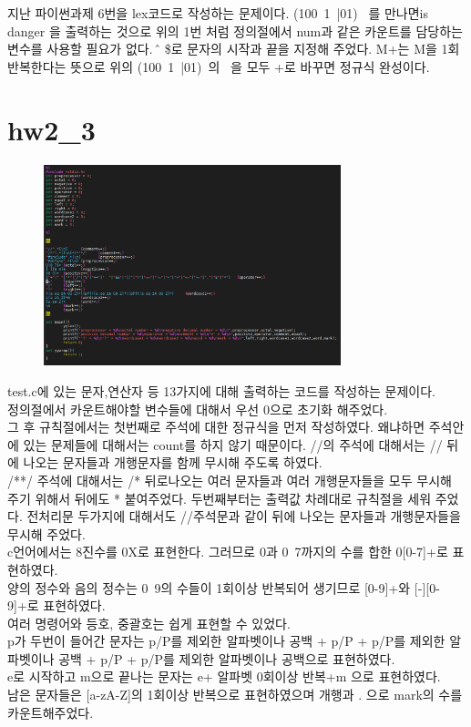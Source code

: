 \documentclass[conference]{IEEEtran}
\begin{document}
지난 파이썬과제 6번을 lex코드로 작성하는 문제이다. (100~1~|01)~ 를 만나면is danger 을 출력하는 것으로 위의 1번 처럼 정의절에서 num과 같은 카운트를 담당하는 변수를 사용할 필요가 없다. \^과 \$로 문자의 시작과 끝을 지정해 주었다. M+는 M을 1회반복한다는 뜻으로 위의 (100~1~|01)~의 ~을 모두 +로 바꾸면 정규식 완성이다.


\section{hw2_3}

\begin{figure}[ht!] %
\centering
\includegraphics[width=3.4in]{3.png}
\label{bench}
\end{figure}
	test.c에 있는 문자,연산자 등 13가지에 대해 출력하는 코드를 작성하는 문제이다. \\
	정의절에서 카운트해야할 변수들에 대해서 우선 0으로 초기화 해주었다. \\
	그 후 규칙절에서는 첫번째로 주석에 대한 정규식을 먼저 작성하였다. 왜냐하면 주석안에 있는 문제들에 대해서는 count를 하지 않기 때문이다. //의 주석에 대해서는 // 뒤에 나오는 문자들과 개행문자를 함께 무시해 주도록 하였다. \\ /**/ 주석에 대해서는 /* 뒤로나오는 여러 문자들과 여러 개행문자들을 모두 무시해 주기 위해서 뒤에도 * 붙여주었다. 두번째부터는 출력값 차례대로 규칙절을 세워 주었다. 전처리문 두가지에 대해서도 //주석문과 같이 뒤에 나오는 문자들과 개행문자들을 무시해 주었다. \\
    c언어에서는 8진수를 0X로 표현한다. 그러므로 0과 0~7까지의 수를 합한 0[0-7]+로 표현하였다. \\
    양의 정수와 음의 정수는 0~9의 수들이 1회이상 반복되어 생기므로 [0-9]+와 [-][0-9]+로 표현하였다.\\
    여러 명령어와 등호, 중괄호는 쉽게 표현할 수 있었다.\\
    p가 두번이 들어간 문자는 p/P를 제외한 알파벳이나 공백 + p/P + p/P를 제외한 알파벳이나 공백 + p/P +  p/P를 제외한 알파벳이나 공백으로 표현하였다.\\
    e로 시작하고 m으로 끝나는 문자는 e+ 알파벳 0회이상 반복+m 으로 표현하였다.\\
    남은 문자들은 [a-zA-Z]의 1회이상 반복으로 표현하였으며 개행과 . 으로 mark의 수를 카운트해주었다.\\
\end{document}
